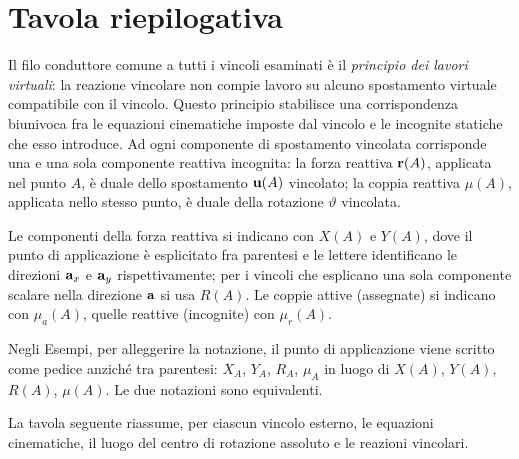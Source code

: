 \section{Tavola riepilogativa}\label{sec:tavola}

Il filo conduttore comune a tutti i vincoli esaminati è il
\emph{principio dei lavori virtuali}: la reazione vincolare
non compie lavoro su alcuno spostamento virtuale compatibile
con il vincolo. Questo principio stabilisce una corrispondenza
biunivoca fra le equazioni cinematiche imposte dal vincolo e
le incognite statiche che esso introduce. Ad ogni componente
di spostamento vincolata corrisponde una e una sola componente
reattiva incognita: la forza reattiva $\mathbf{r}(A)$, applicata nel
punto $A$, è duale dello spostamento $\mathbf{u}(A)$ vincolato; la
coppia reattiva $\mu(A)$, applicata nello stesso punto, è
duale della rotazione $\vartheta$ vincolata.

Le componenti della forza reattiva si indicano con $X(A)$ e
$Y(A)$, dove il punto di applicazione è esplicitato fra
parentesi e le lettere identificano le direzioni $\mathbf{a}_x$ e
$\mathbf{a}_y$ rispettivamente; per i vincoli che esplicano una sola
componente scalare nella direzione $\mathbf{a}$ si usa $R(A)$.
Le coppie attive (assegnate) si indicano con $\mu_a(A)$,
quelle reattive (incognite) con $\mu_r(A)$.

\begin{nota}
	Negli Esempi, per alleggerire la notazione, il punto
	di applicazione viene scritto come pedice anziché tra
	parentesi: $X_A$, $Y_A$, $R_A$, $\mu_{A}$ in luogo
	di $X(A)$, $Y(A)$, $R(A)$, $\mu(A)$. Le due notazioni
	sono equivalenti.
\end{nota}

\medskip

\noindent
La tavola seguente riassume, per ciascun vincolo esterno, le
equazioni cinematiche, il luogo del centro di rotazione
assoluto e le reazioni vincolari.

\medskip

